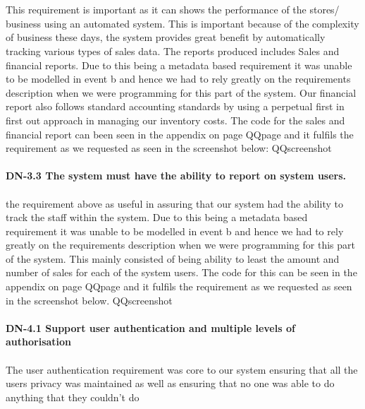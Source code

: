 \documentclass[a4paper]{article}
\begin{document}
\\\\
This requirement is important as it can shows the performance of the stores/ business using an automated system. This is important because of the complexity of business these days, the system provides great benefit by automatically tracking various types of sales data. The reports produced includes Sales and financial reports. Due to this being a metadata based requirement it was unable to be modelled in event b and hence we had to rely greatly on the requirements description when we were programming for this part of the system. Our financial report also follows standard accounting standards by using a perpetual first in first out approach in managing our inventory costs. The code for the sales and financial report can been seen in the appendix on page QQpage and it fulfils the requirement as we requested as seen in the screenshot below: QQscreenshot
\\\\

\textbf{DN-3.3 The system must have the ability to report on system users.}
\\\\
the requirement above as useful in assuring that our system had the ability to track the staff within the system. Due to this being a metadata based requirement it was unable to be modelled in event b and hence we had to rely greatly on the requirements description when we were programming for this part of the system. This mainly consisted of being ability to least the amount and number of sales for each of the system users. The code for this can be seen in the appendix on page QQpage and it fulfils the requirement as we requested as seen in the screenshot below. QQscreenshot
\\\\
\textbf{DN-4.1 Support user authentication and multiple levels of authorisation}
\\\\
The user authentication requirement was core to our system ensuring that all the users privacy was maintained as well as ensuring that no one was able to do anything that they couldn't do
\\\\
\end{document}
